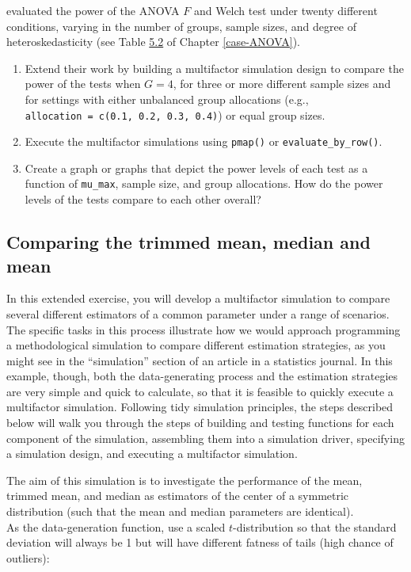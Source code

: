 \documentclass[
]{book}
\begin{document}
\citet{brown1974SmallSampleBehavior} evaluated the power of the ANOVA \(F\) and Welch test under twenty different conditions, varying in the number of groups, sample sizes, and degree of heteroskedasticity (see Table \href{case-ANOVA.html\#tab:BF-Scenarios}{5.2} of Chapter \ref{case-ANOVA}).

\begin{enumerate}
\def\labelenumi{\arabic{enumi}.}
\item
  Extend their work by building a multifactor simulation design to compare the power of the tests when \(G = 4\), for three or more different sample sizes and for settings with either unbalanced group allocations (e.g., \texttt{allocation\ =\ c(0.1,\ 0.2,\ 0.3,\ 0.4)}) or equal group sizes.
\item
  Execute the multifactor simulations using \texttt{pmap()} or \texttt{evaluate\_by\_row()}.
\item
  Create a graph or graphs that depict the power levels of each test as a function of \texttt{mu\_max}, sample size, and group allocations. How do the power levels of the tests compare to each other overall?
\end{enumerate}

\subsection{Comparing the trimmed mean, median and mean}\label{exercise:trimmed-mean}

In this extended exercise, you will develop a multifactor simulation to compare several different estimators of a common parameter under a range of scenarios.
The specific tasks in this process illustrate how we would approach programming a methodological simulation to compare different estimation strategies, as you might see in the ``simulation'' section of an article in a statistics journal.
In this example, though, both the data-generating process and the estimation strategies are very simple and quick to calculate, so that it is feasible to quickly execute a multifactor simulation.
Following tidy simulation principles, the steps described below will walk you through the steps of building and testing functions for each component of the simulation, assembling them into a simulation driver, specifying a simulation design, and executing a multifactor simulation.

The aim of this simulation is to investigate the performance of the mean, trimmed mean, and median as estimators of the center of a symmetric distribution (such that the mean and median parameters are identical).\\
As the data-generation function, use a scaled \(t\)-distribution so that the standard deviation will always be 1 but will have different fatness of tails (high chance of outliers):
\end{document}
